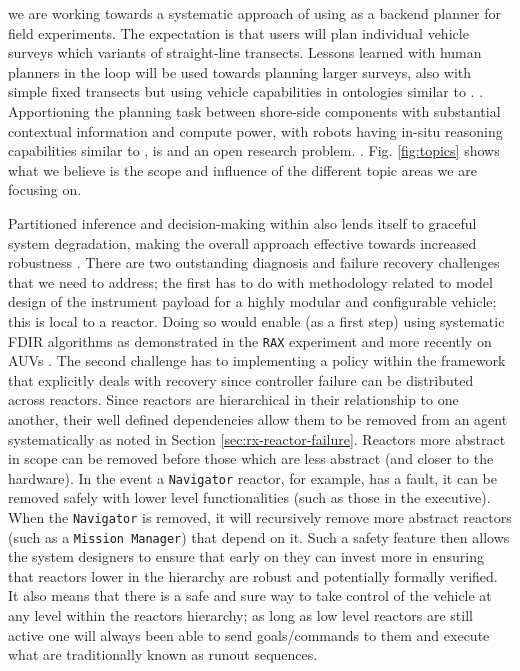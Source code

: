  we are working towards a systematic
approach of using \rx as a backend planner 
for \can field experiments. The expectation is that \od users will
 plan individual vehicle surveys which
 variants of straight-line transects. Lessons
learned with human planners in the loop will be used towards planning
larger surveys, also with simple fixed transects but using vehicle
capabilities in ontologies similar to \cite{patron09}. . Apportioning the
planning task between shore-side components with substantial
contextual information and compute power, with robots having in-situ
reasoning capabilities similar to \rxe, is  and an open research problem. . Fig. \ref{fig:topics} shows what we believe is the scope and
influence of the different topic areas we are 
focusing on.

Partitioned inference and decision-making within \rx also lends itself
to graceful system degradation, making the overall approach effective
towards increased  robustness . There
are two outstanding diagnosis and failure recovery challenges that we
need to address; the first has to do with methodology related to model
design of the instrument payload for a highly modular and configurable
vehicle; this is local to a reactor. Doing so would enable (as a first
step) using systematic FDIR algorithms as demonstrated in the
\texttt{RAX} experiment \cite{williams96,mus98,williams97} and more
recently on AUVs \cite{wang09,ernits10,dearden11}. The second
challenge has to  implementing a policy within the
\rx framework that explicitly deals with recovery since controller
failure can be distributed across reactors. Since reactors are
hierarchical in their relationship to one another, their well defined
dependencies allow them to be removed from an agent systematically as
noted in Section \ref{sec:rx-reactor-failure}. Reactors more abstract
in scope can be removed before those which are less abstract (and
closer to the hardware). In the event a \texttt{Navigator} reactor,
for example, has a fault, it can be removed safely with lower level
functionalities (such as those in the executive). When the
\texttt{Navigator} is removed, it will recursively remove more
abstract reactors (such as a \texttt{Mission Manager}) that depend on
it. Such a safety feature then allows the system designers to ensure
that early on they can invest more in ensuring that reactors lower in
the hierarchy are robust and potentially formally verified. It also
means that there is a safe and sure way to take control of the vehicle
at any level within the reactors hierarchy; as long as low level
reactors are still active one will always been able to send
goals/commands to them and execute what are traditionally known as
runout sequences.

